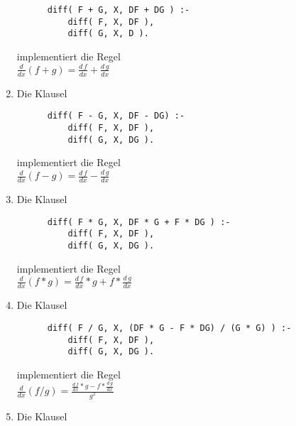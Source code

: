 \begin{enumerate}
      \begin{verbatim}
      diff( F + G, X, DF + DG ) :- 
          diff( F, X, DF ), 
          diff( G, X, D ).
      \end{verbatim}
      \vspace*{-0.7cm}

      implementiert die Regel \\[0.1cm]
      \hspace*{1.3cm} $\frac{d}{dx}(f+g) = \frac{d\,f}{dx} + \frac{d\,g}{dx}$
\item Die Klausel
      \vspace*{-0.3cm}

      \begin{verbatim}
      diff( F - G, X, DF - DG) :- 
          diff( F, X, DF ), 
          diff( G, X, DG ).
      \end{verbatim}
      \vspace*{-0.7cm}

      implementiert die Regel \\[0.1cm]
      \hspace*{1.3cm} $\frac{d}{dx}(f-g) = \frac{d\,f}{dx} - \frac{d\,g}{dx}$
\item Die Klausel
      \vspace*{-0.3cm}

      \begin{verbatim}
      diff( F * G, X, DF * G + F * DG ) :- 
          diff( F, X, DF ), 
          diff( G, X, DG ).
      \end{verbatim}
      \vspace*{-0.7cm}

      implementiert die Regel \\[0.1cm]
      \hspace*{1.3cm} $\frac{d}{dx}(f*g) = \frac{d\,f}{dx}*g + f*\frac{d\,g}{dx}$
\item Die Klausel
      \vspace*{-0.3cm}

      \begin{verbatim}
      diff( F / G, X, (DF * G - F * DG) / (G * G) ) :- 
          diff( F, X, DF ),
          diff( G, X, DG ).
      \end{verbatim}
      \vspace*{-0.7cm}

      implementiert die Regel \\[0.1cm]
      \hspace*{1.3cm} $\frac{d}{dx}(f/g) = \frac{\displaystyle \frac{d\,f}{dx}*g - f*\frac{d\,g}{dx}}{\displaystyle g^2}$
\item Die Klausel
      \vspace*{-0.3cm}


\end{enumerate}
